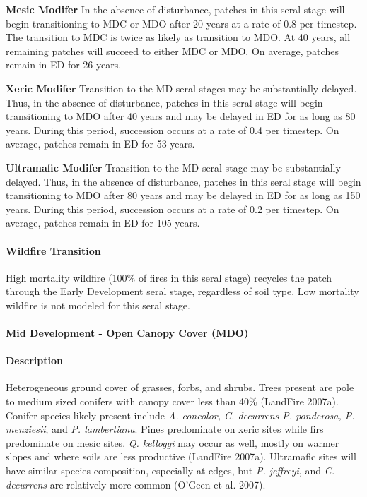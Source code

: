 \begin{adjustwidth}{2cm}{}
\textbf{Mesic Modifer } In the absence of disturbance, patches in this seral stage will begin transitioning to MDC or MDO after 20 years at a rate of 0.8 per timestep. The transition to MDC is twice as likely as transition to MDO.  At 40 years, all remaining patches will succeed to either MDC or MDO. On average, patches remain in ED for 26 years.

\textbf{Xeric Modifer}  Transition to the MD seral stages may be substantially delayed. Thus, in the absence of disturbance, patches in this seral stage will begin transitioning to MDO after 40 years and may be delayed in ED for as long as 80 years. During this period, succession occurs at a rate of 0.4 per timestep. On average, patches remain in ED for 53 years.

\textbf{Ultramafic Modifer}  Transition to the MD seral stage may be substantially delayed. Thus, in the absence of disturbance, patches in this seral stage will begin transitioning to MDO after 80 years and may be delayed in ED for as long as 150 years. During this period, succession occurs at a rate of 0.2 per timestep. On average, patches remain in ED for 105 years.

\end{adjustwidth}



\paragraph{Wildfire Transition} High mortality wildfire (100\% of fires in this seral stage) recycles the patch through the Early Development seral stage, regardless of soil type. Low mortality wildfire is not modeled for this seral stage. 

\noindent\hrulefill


\paragraph{Mid Development - Open Canopy Cover (MDO)} 

\paragraph{Description} Heterogeneous ground cover of grasses, forbs, and shrubs. Trees present are pole to medium sized conifers with canopy cover less than 40\% (LandFire 2007a). Conifer species likely present include \emph{A. concolor, C. decurrens P. ponderosa, P. menziesii}, and \emph{P. lambertiana}. Pines predominate on xeric sites while firs predominate on mesic sites. \emph{Q. kelloggi} may occur as well, mostly on warmer slopes and where soils are less productive (LandFire 2007a). Ultramafic sites will have similar species composition, especially at edges, but \emph{P. jeffreyi}, and \emph{C. decurrens} are relatively more common (O’Geen et al. 2007).

